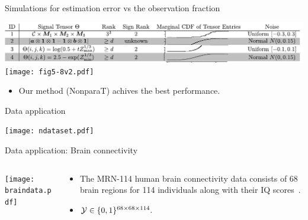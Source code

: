 \documentclass[10pt, mathserif]{beamer} %
\theoremstyle{definition}
\theoremstyle{plain}
\begin{document}
\begin{frame}{Simulations for estimation error vs the observation fraction}
    \begin{center}
    \includegraphics[width = \textwidth]{simulation.pdf}
    \texttt{[image: fig5-8v2.pdf]}
    \end{center}
    \begin{itemize}
        \item Our method (NonparaT) achives the best performance.
    \end{itemize}
\end{frame}

\begin{frame}{Data application}
    \begin{center}
    \texttt{[image: ndataset.pdf]}
    \end{center}
\end{frame}

\begin{frame}{Data application: Brain connectivity}
\begin{columns}
\begin{column}{0.21\textwidth}
   \begin{center}
     \texttt{[image: braindata.pdf]}
     \end{center}
\end{column}
\begin{column}{0.7\textwidth} 
\begin{itemize}
    \item The MRN-114 human brain connectivity data consists of 68 brain regions for 114 individuals along with their IQ scores~\citep{wang2017bayesian}.
    \item  $\mathcal{Y}\in\{0,1\}^{68\times68\times114}.$
\end{itemize}
\end{column}
\end{columns}
\end{frame}
\end{document}
